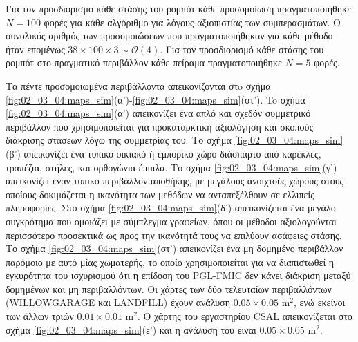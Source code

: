 Για τον προσδιορισμό κάθε στάσης του ρομπότ κάθε προσομοίωση πραγματοποιήθηκε
$N = 100$ φορές για κάθε αλγόριθμο για λόγους αξιοπιστίας των συμπερασμάτων. Ο
συνολικός αριθμός των προσομοιώσεων που πραγματοποιήθηκαν για κάθε μέθοδο ήταν
επομένως $ 38 \times 100 \times 3 \sim \mathcal{O}(4)$.  Για τον προσδιορισμό
κάθε στάσης του ρομπότ στο πραγματικό περιβάλλον κάθε πείραμα πραγματοποιήθηκε
$N = 5$ φορές.

Τα πέντε προσομοιωμένα περιβάλλοντα απεικονίζονται στo σχήμα
\ref{fig:02_03_04:maps_sim}(α')-\ref{fig:02_03_04:maps_sim}(στ'). To σχήμα
\ref{fig:02_03_04:maps_sim}(α') απεικονίζει ένα απλό και σχεδόν συμμετρικό
περιβάλλον που χρησιμοποιείται για προκαταρκτική αξιολόγηση και σκοπούς
διάκρισης στάσεων λόγω της συμμετρίας του. Το σχήμα
\ref{fig:02_03_04:maps_sim}(β') απεικονίζει ένα τυπικό οικιακό ή εμπορικό χώρο
διάσπαρτο από καρέκλες, τραπέζια, στήλες, και ορθογώνια έπιπλα. Το σχήμα
\ref{fig:02_03_04:maps_sim}(γ') απεικονίζει έναν τυπικό περιβάλλον αποθήκης, με
μεγάλους ανοιχτούς χώρους στους οποίους δοκιμάζεται η ικανότητα των μεθόδων να
ανταπεξέλθουν σε ελλιπείς πληροφορίες. Στο σχήμα
\ref{fig:02_03_04:maps_sim}(δ') απεικονίζεται ένα μεγάλο συγκρότημα που
ομοιάζει με σύμπλεγμα γραφείων, όπου οι μέθοδοι αξιολογούνται περισσότερο
προσεκτικά ως προς την ικανότητά τους να επιλύουν ασάφειες στάσης. Το σχήμα
\ref{fig:02_03_04:maps_sim}(στ') απεικονίζει ένα μη δομημένο περιβάλλον
παρόμοιο με αυτό μίας χωματερής, το οποίο χρησιμοποιείται για να διαπιστωθεί η
εγκυρότητα του ισχυρισμού ότι η επίδοση του PGL-FMIC δεν κάνει διάκριση μεταξύ
δομημένων και μη περιβαλλόντων. Οι χάρτες των δύο τελευταίων περιβαλλόντων
(WILLOWGARAGE και LANDFILL) έχουν ανάλυση $0.05\times0.05$ m$^2$, ενώ εκείνοι
των άλλων τριών $0.01\times0.01$ m$^2$. Ο χάρτης του εργαστηρίου CSAL
απεικονίζεται στο σχήμα \ref{fig:02_03_04:maps_sim}(ε') και η ανάλυση του είναι
$0.05\times0.05$ m$^2$.

